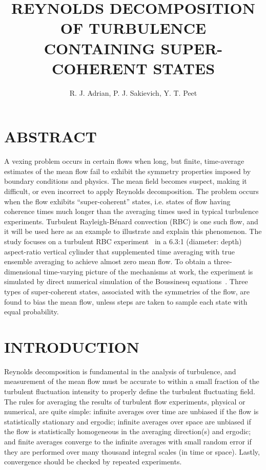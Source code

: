 \documentclass[twocolumn,10pt]{tsfp}
\title{REYNOLDS DECOMPOSITION OF TURBULENCE CONTAINING SUPER-COHERENT STATES}
\author{R. J. Adrian, P. J. Sakievich, Y. T. Peet
    \affiliation{
	Mechanical and Aerospace Engineering\\
	School of Matter Transport and Energy, \\
	 Arizona State University\\
	501 E. Tyler Mall, Tempe, AZ 85287\\
    email: rjadrian@asu.edu
    }	
}
\begin{document}
\maketitle   %

\fontsize{9}{11}\selectfont

\section*{ABSTRACT}
A vexing problem occurs in certain flows when long, but finite, time-average estimates of the mean flow fail to exhibit the symmetry properties imposed by boundary conditions and physics. The mean field becomes suspect, making it difficult, or even incorrect to apply Reynolds decomposition. The problem occurs when the flow exhibits ``super-coherent'' states, i.e. states of flow having coherence times much longer than the averaging times used in typical turbulence experiments. Turbulent Rayleigh-B\'{e}nard convection (RBC) is one such flow, and it will be used here as an example to illustrate and explain this phenomenon. The study focuses on a turbulent RBC experiment~\citep{fernandes2001spatial} in a 6.3:1 (diameter: depth) aspect-ratio vertical cylinder that supplemented time averaging with true ensemble averaging to achieve almost zero mean flow. To obtain a three-dimensional time-varying picture of the mechanisms at work, the experiment is simulated by direct numerical simulation of the Boussinesq equations~\citep{sakievich2016large}. Three types of super-coherent states, associated with the symmetries of the flow, are found to bias the mean flow, unless steps are taken to sample each state with equal probability.  
\section*{INTRODUCTION}
Reynolds decomposition is fundamental in the analysis of turbulence, and measurement of the mean flow must be accurate to within a small fraction of the turbulent fluctuation intensity to properly define the turbulent fluctuating field. The rules for averaging the results of turbulent flow experiments, physical or numerical, are quite simple: infinite averages over time are unbiased if the flow is statistically stationary and ergodic; infinite averages over space are unbiased if the flow is statistically homogeneous in the averaging direction(s) and ergodic; and finite averages converge to the infinite averages with small random error if they are performed over many thousand integral scales (in time or space). Lastly, convergence should be checked by repeated experiments.
\end{document}
